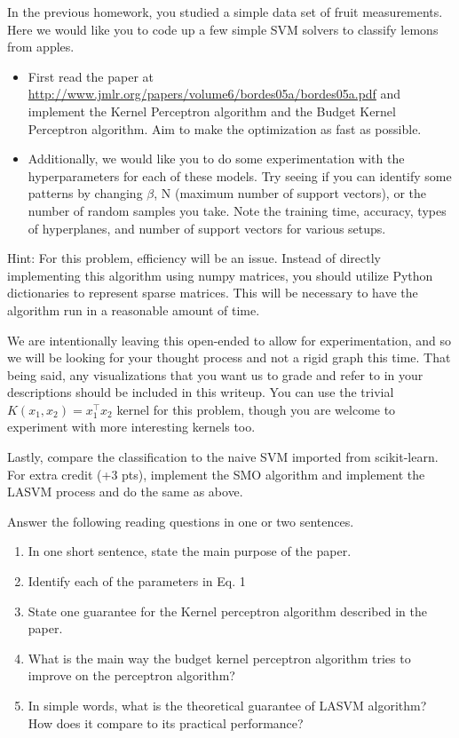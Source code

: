 \documentclass[submit]{harvardml}
\begin{document}
\newpage
\begin{problem}



In the previous homework, you studied a simple data set of fruit measurements.
Here we would like you to code up a few simple SVM solvers to classify lemons from
apples. 
\begin{itemize}
\item First read the paper at
  \url{http://www.jmlr.org/papers/volume6/bordes05a/bordes05a.pdf} and
  implement the Kernel Perceptron algorithm and the Budget Kernel
  Perceptron algorithm. Aim to make the optimization as fast as possible.
\item Additionally, we would like you to do some experimentation with
  the hyperparameters for each of these models. Try seeing if you can
  identify some patterns by changing $\beta$, N (maximum number of
  support vectors), or the number of random samples you take.  Note
  the training time, accuracy, types of hyperplanes, and number of
  support vectors for various setups.
\end{itemize}

Hint: For this problem, efficiency will be an issue. Instead of directly
implementing this algorithm using numpy matrices, you should utilize
Python dictionaries to represent sparse matrices. This will be necessary 
to have the algorithm run in a reasonable amount of time.   

We are intentionally leaving this open-ended to allow for experimentation, and so we will be looking for your thought process and not a rigid graph this time. That being said, any visualizations that you want us to grade and refer to in your descriptions should be included in this writeup. You can use the trivial $K(x_1, x_2) = x_1^\top x_2$ kernel for this problem, though you are welcome to experiment with more interesting kernels too.

Lastly, compare the classification to the naive SVM imported from scikit-learn. For extra credit (+3 pts), implement the SMO algorithm and implement the LASVM process and do the same as above.


Answer the following reading questions in one or two sentences.

\begin{enumerate}
\item In one short sentence, state the main purpose of the paper.
\item Identify each of the parameters in Eq. 1
\item State one guarantee for the Kernel perceptron algorithm described in the
  paper.
\item What is the main way the budget kernel perceptron algorithm tries to
  improve on the perceptron algorithm?
\item In simple words, what is the theoretical guarantee of LASVM algorithm? How
  does it compare to its practical performance?
\end{enumerate}


\end{problem}
\end{document}
